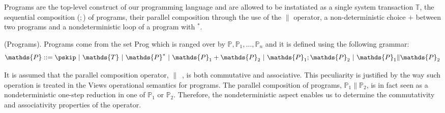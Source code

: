 Programs are the top-level construct of our programming language and are allowed to be instatiated as a single system transaction $\mathds{T}$, the sequential composition ($;$) of programs, their parallel composition through the use of the $\|$ operator, a non-deterministic choice $+$ between two programs and a nondeterministic loop of a program with $^*$.

\begin{defn}
	(Programs).
	Programs come from the set \textsf{Prog} which is ranged over by $\mathds{P}, \mathds{P}_1, \ldots, \mathds{P}_n$ and it is defined using the following grammar:
	\[
		\mathds{P} ::=
			\pskip\
			|\ \mathds{T}\
			|\ \mathds{P}^*\
			|\ \mathds{P}_1 + \mathds{P}_2\
			|\ \mathds{P}_1; \mathds{P}_2\
			|\ \mathds{P}_1 \| \mathds{P}_2
	\]
\end{defn}
It is assumed that the parallel composition operator, $\|$\ , is both commutative and associative. This peculiarity is justified by the way such operation is treated in the Views operational semantics for programs. The parallel composition of programs, $\mathds{P}_1 \| \mathds{P}_2$, is in fact seen as a nondeterministic one-step reduction in one of $\mathds{P}_1$ or $\mathds{P}_2$. Therefore, the nondeterministic aspect enables us to determine the commutativity and associativity properties of the operator.